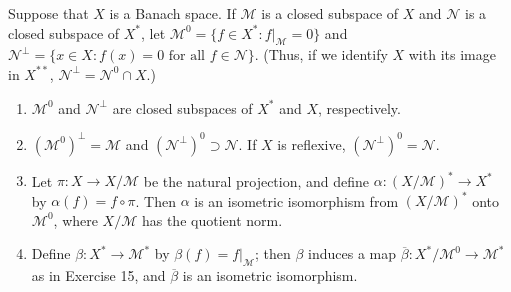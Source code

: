\documentclass[12pt,a4paper]{article}
\begin{document}
\begin{problem}\label{prob:5-23}
Suppose that $X$ is a Banach space. If $\mathcal{M}$ is a closed subspace of $X$ and $\mathcal{N}$ is a closed subspace of $X^*$, let $\mathcal{M}^0 = \{f \in X^* : f|_\mathcal{M} = 0\}$ and $\mathcal{N}^\perp = \{x \in X : f(x) = 0 \text{ for all } f \in \mathcal{N}\}$. (Thus, if we identify $X$ with its image in $X^{**}$, $\mathcal{N}^\perp = \mathcal{N}^0 \cap X$.)
\begin{enumerate}[label=\alph*.]
\item $\mathcal{M}^0$ and $\mathcal{N}^\perp$ are closed subspaces of $X^*$ and $X$, respectively.
\item $(\mathcal{M}^0)^\perp = \mathcal{M}$ and $(\mathcal{N}^\perp)^0 \supset \mathcal{N}$. If $X$ is reflexive, $(\mathcal{N}^\perp)^0 = \mathcal{N}$.
\item Let $\pi : X \rightarrow X/\mathcal{M}$ be the natural projection, and define $\alpha : (X/\mathcal{M})^* \rightarrow X^*$ by $\alpha(f) = f \circ \pi$. Then $\alpha$ is an isometric isomorphism from $(X/\mathcal{M})^*$ onto $\mathcal{M}^0$, where $X/\mathcal{M}$ has the quotient norm.
\item Define $\beta : X^* \rightarrow \mathcal{M}^*$ by $\beta(f) = f|_\mathcal{M}$; then $\beta$ induces a map $\overline{\beta} : X^*/\mathcal{M}^0 \rightarrow \mathcal{M}^*$ as in Exercise 15, and $\overline{\beta}$ is an isometric isomorphism.
\end{enumerate}
\end{problem}
\end{document}
